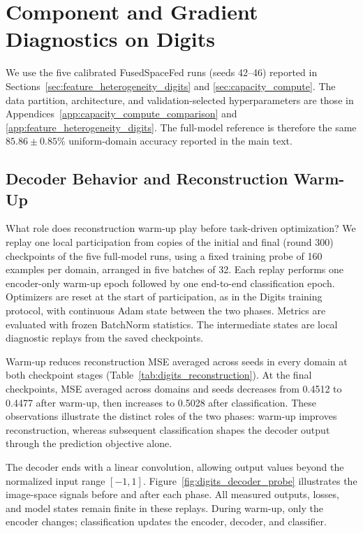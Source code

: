 \clearpage
\section{Component and Gradient Diagnostics on Digits}
\label{app:digits_diagnostics}

We use the five calibrated FusedSpaceFed runs (seeds 42--46) reported in
Sections~\ref{sec:feature_heterogeneity_digits} and \ref{sec:capacity_compute}.
The data partition, architecture, and validation-selected hyperparameters
are those in Appendices~\ref{app:capacity_compute_comparison} and
\ref{app:feature_heterogeneity_digits}. The full-model reference is therefore
the same $85.86\pm0.85\%$ uniform-domain accuracy reported in the main text.

\subsection{Decoder Behavior and Reconstruction Warm-Up}
\label{app:digits_decoder}

What role does reconstruction warm-up play before task-driven optimization?
We replay one local participation from copies of the initial and final
(round 300) checkpoints of the five full-model runs, using a fixed training
probe of 160 examples per domain, arranged in five batches of 32.
Each replay performs one encoder-only warm-up epoch followed by one
end-to-end classification epoch. Optimizers are reset at the start of
participation, as in the Digits training protocol, with continuous Adam
state between the two phases. Metrics are evaluated with frozen BatchNorm
statistics. The intermediate states are local diagnostic replays from the
saved checkpoints.

Warm-up reduces reconstruction MSE averaged across seeds in every domain
at both checkpoint stages (Table~\ref{tab:digits_reconstruction}).
At the final checkpoints, MSE averaged across domains and seeds decreases
from 0.4512 to 0.4477 after warm-up, then increases to 0.5028 after
classification. These observations illustrate the distinct roles of the
two phases: warm-up improves reconstruction, whereas subsequent
classification shapes the decoder output through the prediction objective
alone.



The decoder ends with a linear convolution, allowing output values beyond
the normalized input range $[-1,1]$. Figure~\ref{fig:digits_decoder_probe}
illustrates the image-space signals before and after each phase.
All measured outputs, losses, and model states remain finite in these
replays. During warm-up, only the encoder changes; classification updates
the encoder, decoder, and classifier.

